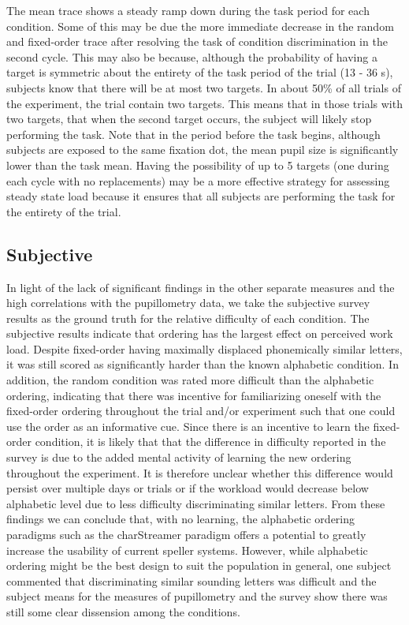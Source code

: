 \documentclass[10pt]{article}
\begin{document}
The mean trace shows a steady ramp down
during the task period for each condition.  Some of this may be due
the more immediate decrease in the random and fixed-order
trace after resolving the task of condition discrimination in
the second cycle. This may also be because, although the
probability of having a target is symmetric about the entirety
of the task period of the trial (13 - 36 s), subjects know
that there will be at most two targets.  In about 50\% of all
trials of the experiment, the trial contain two targets. This
means that in those trials with two targets, that when the
second target occurs, the subject will likely stop performing
the task.  Note that in the period before the task begins,
although subjects are exposed to the same fixation dot, the
mean pupil size is significantly lower than the task mean.
Having the possibility of up to 5 targets (one during each
cycle with no replacements) may be a more effective strategy
for assessing steady state load because it ensures that all
subjects are performing the task for the entirety of the
trial.

\subsection{Subjective}

In light of the lack of significant findings in the other
separate measures and the high correlations with the
pupillometry data, we take the subjective survey results as
the ground truth for the relative difficulty of each
condition.  The subjective results indicate that ordering has
the largest effect on perceived work load. Despite fixed-order
having maximally displaced phonemically similar letters, it
was still scored as significantly harder than the known
alphabetic condition.  In addition, the random condition was
rated more difficult than the alphabetic ordering, indicating
that there was incentive for familiarizing oneself with the
fixed-order ordering throughout the trial and/or experiment
such that one could use the order as an informative cue.
Since there is an incentive to learn the fixed-order
condition, it is likely that that the difference in difficulty
reported in the survey is due to the added mental activity of
learning the new ordering throughout the experiment. It is
therefore unclear whether this difference would persist over
multiple days or trials or if the workload would decrease
below alphabetic level due to less difficulty discriminating
similar letters.  From these findings we can conclude that,
with no learning, the alphabetic ordering paradigms such as
the charStreamer paradigm offers a potential to greatly
increase the usability of current speller systems.  However,
while alphabetic ordering might be the best design to suit the
population in general, one subject commented that
discriminating similar sounding letters was difficult and the
subject means for the measures of pupillometry and the survey
show there was still some clear dissension among the conditions. 
\end{document}
